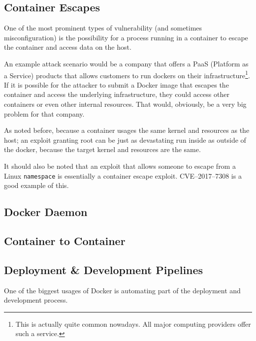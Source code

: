 \subsection{Container Escapes}
One of the most prominent types of vulnerability (and sometimes misconfiguration) is the possibility for a process running in a container to escape the container and access data on the host.

\hfill

An example attack scenario would be a company that offers a PaaS (Platform as a Service) products that allows customers to run dockers on their infrastructure\footnote{This is actually quite common nowadays. All major computing providers offer such a service.}. If it is possible for the attacker to submit a Docker image that escapes the container and access the underlying infrastructure, they could access other containers or even other internal resources. That would, obviously, be a very big problem for that company.

\hfill

As noted before, because a container usages the same kernel and resources as the host; an exploit granting root can be just as devastating run inside as outside of the docker, because the target kernel and resources are the same.

It should also be noted that an exploit that allows someone to escape from a Linux \lstinline{namespace} is essentially a container escape exploit. CVE--2017--7308\cite{cve20177308} is a good example of this.

\subsection{Docker Daemon}

\subsection{Container to Container}

\subsection{Deployment \& Development Pipelines}
One of the biggest usages of Docker is automating part of the deployment and development process. 

